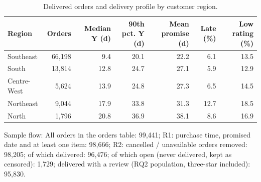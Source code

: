 \begin{table}[!htbp]
\centering
\footnotesize
\caption{Delivered orders and delivery profile by customer region.}
\label{tab:sample}
\begin{tabular}{lrrrrrr}
\toprule
Region & Orders & Median Y (d) & 90th pct. Y (d) & Mean promise (d) & Late (\%) & Low rating (\%) \\
\midrule
Southeast & 66,198 & 9.4 & 20.1 & 22.2 & 6.1 & 13.5 \\
South & 13,814 & 12.8 & 24.7 & 27.1 & 5.9 & 12.9 \\
Centre-West & 5,624 & 13.9 & 24.8 & 27.3 & 6.5 & 14.5 \\
Northeast & 9,044 & 17.9 & 33.8 & 31.3 & 12.7 & 18.5 \\
North & 1,796 & 20.8 & 36.9 & 38.1 & 8.6 & 16.9 \\
\bottomrule
\end{tabular}
\par\smallskip
\parbox{\linewidth}{\scriptsize Sample flow: All orders in the orders table: 99,441; R1: purchase time, promised date and at least one item: 98,666; R2: cancelled / unavailable orders removed: 98,205; of which delivered: 96,476; of which open (never delivered, kept as censored): 1,729; delivered with a review (RQ2 population, three-star included): 95,830.}
\end{table}
